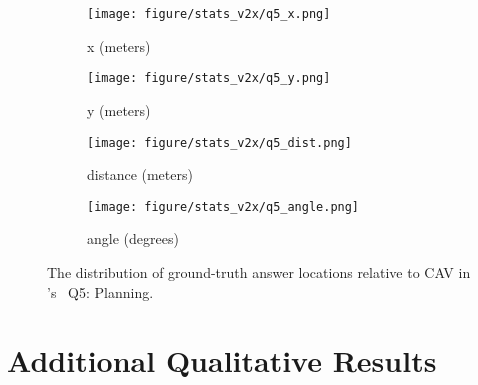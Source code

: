 \begin{figure}[!t]
        \centering
        \begin{subfigure}[t]{0.23\textwidth}
            \centering 
            \texttt{[image: figure/stats\_v2x/q5\_x.png]}
            \vspace{-20pt}
            \caption[]%
            {{x (meters)}}    
        \end{subfigure}
        \hfill
        \begin{subfigure}[t]{0.23\textwidth}  
            \centering 
            \texttt{[image: figure/stats\_v2x/q5\_y.png]}
            \vspace{-20pt}
            \caption[]%
            {{y (meters)}}
        \end{subfigure}

        \begin{subfigure}[t]{0.23\textwidth}
            \centering 
            \texttt{[image: figure/stats\_v2x/q5\_dist.png]}
            \vspace{-20pt}
            \caption[]%
            {{distance (meters)}}
        \end{subfigure}
        \hfill
        \begin{subfigure}[t]{0.23\textwidth}
            \centering 
            \texttt{[image: figure/stats\_v2x/q5\_angle.png]}
            \vspace{-20pt}
            \caption[]%
            {{angle (degrees)}}
        \end{subfigure}
        \hfill
        
        \vspace{-10pt}
        \caption[]
        {
        The distribution of ground-truth answer locations relative to CAV in \namedataset's \namexsplit~Q5: Planning. 
        } 
        \label{fig:stats_v2x_q5}
        \vspace{-10pt}
\end{figure}


   

\section{Additional Qualitative Results}


